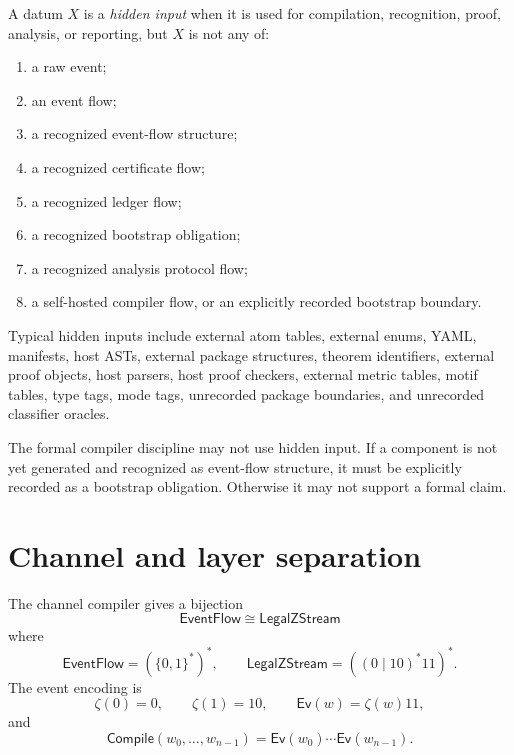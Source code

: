 \begin{definition}
\label{def:main-theorems-hidden-input}
A datum $X$ is a \emph{hidden input} when it is used for compilation, recognition, proof, analysis, or reporting, but $X$ is not any of:
\begin{enumerate}
\item a raw event;
\item an event flow;
\item a recognized event-flow structure;
\item a recognized certificate flow;
\item a recognized ledger flow;
\item a recognized bootstrap obligation;
\item a recognized analysis protocol flow;
\item a self-hosted compiler flow, or an explicitly recorded bootstrap boundary.
\end{enumerate}
Typical hidden inputs include external atom tables, external enums, YAML, manifests, host ASTs, external package structures, theorem identifiers, external proof objects, host parsers, host proof checkers, external metric tables, motif tables, type tags, mode tags, unrecorded package boundaries, and unrecorded classifier oracles.
\end{definition}

\begin{principle}
\label{prin:main-theorems-no-hidden-input}
The formal compiler discipline may not use hidden input. If a component is not yet generated and recognized as event-flow structure, it must be explicitly recorded as a bootstrap obligation. Otherwise it may not support a formal claim.
\end{principle}

\section{Channel and layer separation}
\label{sec:main-theorems-channel-separation}

\begin{theorem}
\label{thm:main-theorems-channel-bijection}
The channel compiler gives a bijection
$$
  \boxed{\mathsf{EventFlow}\cong\mathsf{LegalZStream}}
$$
where
$$
  \mathsf{EventFlow}=(\{0,1\}^{\ast})^{\ast},
  \qquad
  \mathsf{LegalZStream}=((0\mid 10)^{\ast}11)^{\ast}.
$$
The event encoding is
$$
  \zeta(0)=0,
  \qquad
  \zeta(1)=10,
  \qquad
  \mathsf{Ev}(w)=\zeta(w)11,
$$
and
$$
  \mathsf{Compile}(w_0,\ldots,w_{n-1})
  =
  \mathsf{Ev}(w_0)\cdots\mathsf{Ev}(w_{n-1}).
$$
\end{theorem}

